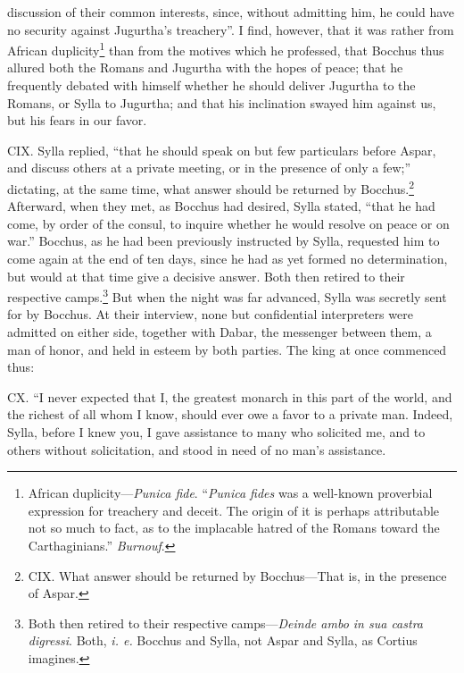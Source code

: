 discussion of their common interests, since, without admitting him, he
could have no security against Jugurtha's treachery''. I find, however,
that it was rather from African duplicity\footnote{African duplicity—\emph{Punica fide}. ``\emph{Punica fides} was a
well-known proverbial expression for treachery and deceit. The origin
of it is perhaps attributable not so much to fact, as to the implacable
hatred of the Romans toward the Carthaginians.'' \emph{Burnouf}.} than from the motives
which he professed, that Bocchus thus allured both the Romans and
Jugurtha with the hopes of peace; that he frequently debated with
himself whether he should deliver Jugurtha to the Romans, or Sylla to
Jugurtha; and that his inclination swayed him against us, but his
fears in our favor.

CIX. Sylla replied, ``that he should speak on but few particulars
before Aspar, and discuss others at a private meeting, or in the
presence of only a few;'' dictating, at the same time, what answer
should be returned by Bocchus.\footnote{CIX. What answer should be returned by Bocchus—That is, in
the presence of Aspar.} Afterward, when they met, as
Bocchus had desired, Sylla stated, ``that he had come, by order of the
consul, to inquire whether he would resolve on peace or on war.''
Bocchus, as he had been previously instructed by Sylla, requested him
to come again at the end of ten days, since he had as yet formed no
determination, but would at that time give a decisive answer. Both
then retired to their respective camps.\footnote{Both then retired to their respective camps—\emph{Deinde ambo in
sua castra digressi}. Both, \emph{i. e.} Bocchus and Sylla, not Aspar and
Sylla, as Cortius imagines.} But when the night was
far advanced, Sylla was secretly sent for by Bocchus. At their
interview, none but confidential interpreters were admitted on either
side, together with Dabar, the messenger between them, a man of honor,
and held in esteem by both parties. The king at once commenced thus:

CX. ``I never expected that I, the greatest monarch in this part of the
world, and the richest of all whom I know, should ever owe a favor to
a private man. Indeed, Sylla, before I knew you, I gave assistance to
many who solicited me, and to others without solicitation, and stood
in need of no man's assistance.

